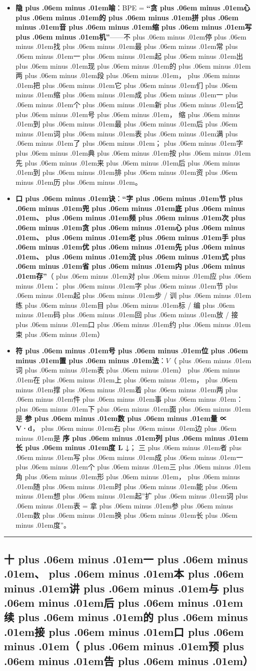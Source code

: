 \documentclass[
]{article}
\providecommand{\tightlist}{%
  \setlength{\itemsep}{0pt}\setlength{\parskip}{0pt}}
\def\zh#1{{\zhfont #1}}
\def\sym#1{{\symfont #1}}
\def\zhglue{\hskip0pt plus .06em minus .01em}
\begin{document}
\begin{itemize}
\tightlist
\item
  \textbf{\zh{隐\zhglue 喻}}\zh{：}BPE = \textbf{``\zh{贪\zhglue 心\zhglue 的\zhglue 拼\zhglue 音\zhglue 缩\zhglue 写\zhglue 机}''}------\zh{不\zhglue 停\zhglue 找\zhglue 最\zhglue 常\zhglue 一\zhglue 起\zhglue 出\zhglue 现\zhglue 的\zhglue 两\zhglue 段\zhglue ，\zhglue 把\zhglue 它\zhglue 们\zhglue 缩\zhglue 成\zhglue 一\zhglue 个\zhglue 新\zhglue 记\zhglue 号\zhglue ，} \zh{缩\zhglue 到\zhglue 最\zhglue 后\zhglue 词\zhglue 表\zhglue 满\zhglue 了\zhglue ；\zhglue 字\zhglue 典\zhglue 按\zhglue 先\zhglue 来\zhglue 后\zhglue 到\zhglue 排\zhglue 资\zhglue 历\zhglue 。}
\item
  \textbf{\zh{口\zhglue 诀}}\zh{：}\textbf{``\zh{字\zhglue 节\zhglue 兜\zhglue 底\zhglue 、\zhglue 频\zhglue 次\zhglue 贪\zhglue 心\zhglue 、\zhglue 老\zhglue 手\zhglue 优\zhglue 先\zhglue 、\zhglue 流\zhglue 式\zhglue 省\zhglue 内\zhglue 存}''}\zh{（\zhglue 对\zhglue 应\zhglue ：\zhglue 字\zhglue 节\zhglue 起\zhglue 步} / \zh{训\zhglue 练\zhglue 目\zhglue 标} / \zh{编\zhglue 码\zhglue 回\zhglue 放} / \zh{接\zhglue 口\zhglue 约\zhglue 束\zhglue ）}
\item
  \textbf{\zh{符\zhglue 号\zhglue 位\zhglue 置\zhglue 法}}\zh{：}\(V\)\zh{（\zhglue 词\zhglue 表\zhglue ）\zhglue 在\zhglue 上\zhglue ，\zhglue 撑\zhglue 着\zhglue 两\zhglue 件\zhglue 事\zhglue ：\zhglue 下\zhglue 面\zhglue 是} \textbf{\zh{参\zhglue 数\zhglue 量} \sym{∝} V\sym{·}d}\zh{，\zhglue 右\zhglue 边\zhglue 是} \textbf{\zh{序\zhglue 列\zhglue 长\zhglue 度} L \sym{↓}}\zh{；} \zh{三\zhglue 者\zhglue 写\zhglue 成\zhglue 一\zhglue 个\zhglue 三\zhglue 角\zhglue 形\zhglue ，\zhglue 随\zhglue 时\zhglue 能\zhglue 想\zhglue 起}''\zh{扩\zhglue 词\zhglue 表} = \zh{拿\zhglue 参\zhglue 数\zhglue 换\zhglue 长\zhglue 度}''\zh{。}
\end{itemize}

\begin{center}\rule{0.5\linewidth}{0.5pt}\end{center}

\subsection{\zh{十\zhglue 一\zhglue 、\zhglue 本\zhglue 讲\zhglue 与\zhglue 后\zhglue 续\zhglue 的\zhglue 接\zhglue 口\zhglue （\zhglue 预\zhglue 告\zhglue ）}}\label{ux5341ux4e00ux672cux8bb2ux4e0eux540eux7eedux7684ux63a5ux53e3ux9884ux544a}
\end{document}
